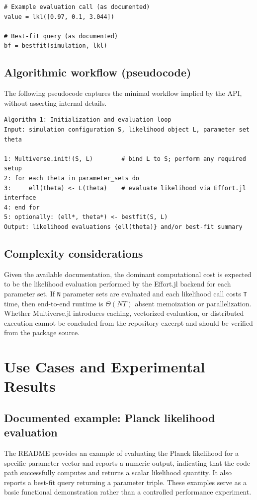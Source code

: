 \documentclass[11pt]{article}
\begin{document}
\begin{lstlisting}
# Example evaluation call (as documented)
value = lkl([0.97, 0.1, 3.044])

# Best-fit query (as documented)
bf = bestfit(simulation, lkl)
\end{lstlisting}

\subsection{Algorithmic workflow (pseudocode)}
The following pseudocode captures the minimal workflow implied by the API, without asserting internal details.

\begin{verbatim}
Algorithm 1: Initialization and evaluation loop
Input: simulation configuration S, likelihood object L, parameter set theta

1: Multiverse.init!(S, L)        # bind L to S; perform any required setup
2: for each theta in parameter_sets do
3:     ell(theta) <- L(theta)    # evaluate likelihood via Effort.jl interface
4: end for
5: optionally: (ell*, theta*) <- bestfit(S, L)
Output: likelihood evaluations {ell(theta)} and/or best-fit summary
\end{verbatim}

\subsection{Complexity considerations}
Given the available documentation, the dominant computational cost is expected to be the likelihood evaluation performed by the Effort.jl backend for each parameter set.
If \texttt{N} parameter sets are evaluated and each likelihood call costs \texttt{T} time, then end-to-end runtime is \(\Theta(NT)\) absent memoization or parallelization.
Whether Multiverse.jl introduces caching, vectorized evaluation, or distributed execution cannot be concluded from the repository excerpt and should be verified from the package source.

\section{Use Cases and Experimental Results}
\subsection{Documented example: Planck likelihood evaluation}
The README provides an example of evaluating the Planck likelihood for a specific parameter vector and reports a numeric output, indicating that the code path successfully computes and returns a scalar likelihood quantity.
It also reports a best-fit query returning a parameter triple.
These examples serve as a basic functional demonstration rather than a controlled performance experiment.
\end{document}
